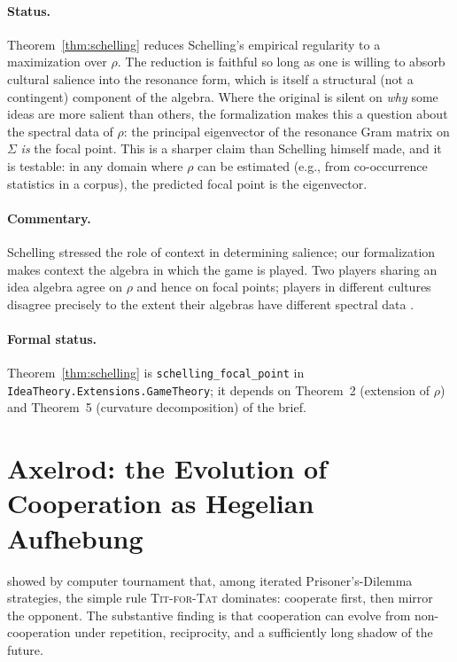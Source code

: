 \paragraph{Status.} Theorem~\ref{thm:schelling} reduces Schelling's
empirical regularity to a maximization over $\rho$. The reduction is
faithful so long as one is willing to absorb cultural salience into the
resonance form, which is itself a structural (not a contingent)
component of the algebra. Where the original is silent on \emph{why}
some ideas are more salient than others, the formalization makes this a
question about the spectral data of $\rho$: the principal eigenvector of
the resonance Gram matrix on $\Sigma$ \emph{is} the focal point. This is
a sharper claim than Schelling himself made, and it is testable: in any
domain where $\rho$ can be estimated (e.g., from co-occurrence statistics
in a corpus), the predicted focal point is the eigenvector.

\paragraph{Commentary.} Schelling \citep{Schelling1960} stressed the role
of context in determining salience; our formalization makes context the
algebra in which the game is played. Two players sharing an idea algebra
agree on $\rho$ and hence on focal points; players in different cultures
disagree precisely to the extent their algebras have different spectral
data \citep{Granovetter1973}.

\paragraph{Formal status.} Theorem~\ref{thm:schelling} is
\texttt{schelling\_focal\_point} in
\texttt{IdeaTheory.Extensions.GameTheory}; it depends on Theorem~2
(extension of $\rho$) and Theorem~5 (curvature decomposition) of the
brief.

\section{Axelrod: the Evolution of Cooperation as Hegelian Aufhebung}
\label{sec:axelrod}

\citet{Axelrod1984} showed by computer tournament that, among iterated
Prisoner's-Dilemma strategies, the simple rule \textsc{Tit-for-Tat}
dominates: cooperate first, then mirror the opponent. The substantive
finding is that cooperation can evolve from non-cooperation under
repetition, reciprocity, and a sufficiently long shadow of the future.

